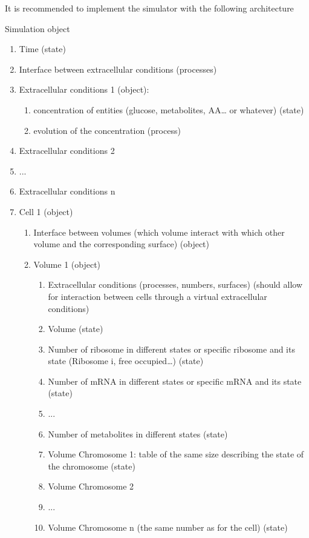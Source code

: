 It is recommended to implement the simulator with the following architecture
\begin{description}
  \item Simulation object
  \begin{enumerate}
    \item Time (state)
    \item Interface between extracellular conditions (processes)
    \item Extracellular conditions 1 (object):
    \begin{enumerate}
      \item concentration of entities (glucose, metabolites, AA… or whatever) (state)
      \item evolution of the concentration (process)
    \end{enumerate}
    \item Extracellular conditions 2
    \item ...
    \item Extracellular conditions n
    \item Cell 1 (object)
    \begin{enumerate}
      \item Interface between volumes (which volume interact with which other volume and the corresponding surface) (object)
      \item Volume 1 (object)
      \begin{enumerate}
        \item Extracellular conditions (processes, numbers, surfaces) (should allow for interaction between cells through a virtual extracellular conditions)
        \item Volume (state)
        \item Number of ribosome in different states or specific ribosome and its state (Ribosome i, free occupied…) (state)
        \item Number of mRNA in different states or specific mRNA and its state (state)
        \item ...
        \item Number of metabolites in different states (state)
        \item Volume Chromosome 1: table of the same size describing the state of the chromosome (state)
        \item Volume Chromosome 2
        \item ...
        \item Volume Chromosome n (the same number as for the cell) (state)

\end{enumerate}
\end{enumerate}
\end{enumerate}
\end{description}
